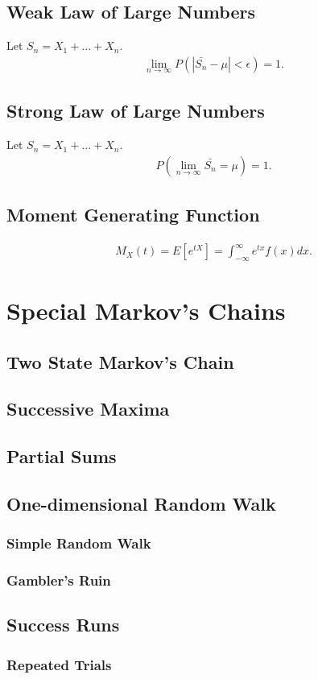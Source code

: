 \documentclass{article}
\begin{document}
\subsection{Weak Law of Large Numbers}
Let $S_n = X_1 + \dots + X_n$. 
\begin{align}
    & \lim_{n\rightarrow\infty}P(|\bar{S_n}-\mu|<\epsilon) = 1. \nonumber
\end{align}

\subsection{Strong Law of Large Numbers}
Let $S_n = X_1 + \dots + X_n$.
\begin{align}
    & P(\lim_{n\rightarrow\infty}\bar{S_n}=\mu) = 1. \nonumber
\end{align}

\subsection{Moment Generating Function}
\begin{align}
    & M_X(t) = E[e^{tX}] = \int_{-\infty}^\infty e^{tx}f(x)dx. \nonumber
\end{align}

\newpage
\section{Special Markov's Chains}
\subsection{Two State Markov's Chain}
\subsection{Successive Maxima}
\subsection{Partial Sums}
\subsection{One-dimensional Random Walk}
\subsubsection{Simple Random Walk}
\subsubsection{Gambler's Ruin}
\subsection{Success Runs}
\subsubsection{Repeated Trials}
\end{document}
